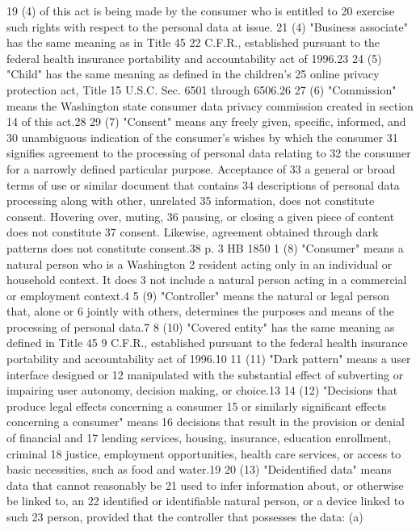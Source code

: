 19 (4) of this act is being made by the consumer who is entitled to
20 exercise such rights with respect to the personal data at issue.
21 (4) "Business associate" has the same meaning as in Title 45
22 C.F.R., established pursuant to the federal health insurance
portability and accountability act of 1996.23
24 (5) "Child" has the same meaning as defined in the children's
25 online privacy protection act, Title 15 U.S.C. Sec. 6501 through
6506.26
27 (6) "Commission" means the Washington state consumer data privacy
commission created in section 14 of this act.28
29 (7) "Consent" means any freely given, specific, informed, and
30 unambiguous indication of the consumer's wishes by which the consumer
31 signifies agreement to the processing of personal data relating to
32 the consumer for a narrowly defined particular purpose. Acceptance of
33 a general or broad terms of use or similar document that contains
34 descriptions of personal data processing along with other, unrelated
35 information, does not constitute consent. Hovering over, muting,
36 pausing, or closing a given piece of content does not constitute
37 consent. Likewise, agreement obtained through dark patterns does not
constitute consent.38
p. 3 HB 1850
1 (8) "Consumer" means a natural person who is a Washington
2 resident acting only in an individual or household context. It does
3 not include a natural person acting in a commercial or employment
context.4
5 (9) "Controller" means the natural or legal person that, alone or
6 jointly with others, determines the purposes and means of the
processing of personal data.7
8 (10) "Covered entity" has the same meaning as defined in Title 45
9 C.F.R., established pursuant to the federal health insurance
portability and accountability act of 1996.10
11 (11) "Dark pattern" means a user interface designed or
12 manipulated with the substantial effect of subverting or impairing
user autonomy, decision making, or choice.13
14 (12) "Decisions that produce legal effects concerning a consumer
15 or similarly significant effects concerning a consumer" means
16 decisions that result in the provision or denial of financial and
17 lending services, housing, insurance, education enrollment, criminal
18 justice, employment opportunities, health care services, or access to
basic necessities, such as food and water.19
20 (13) "Deidentified data" means data that cannot reasonably be
21 used to infer information about, or otherwise be linked to, an
22 identified or identifiable natural person, or a device linked to such
23 person, provided that the controller that possesses the data: (a)
